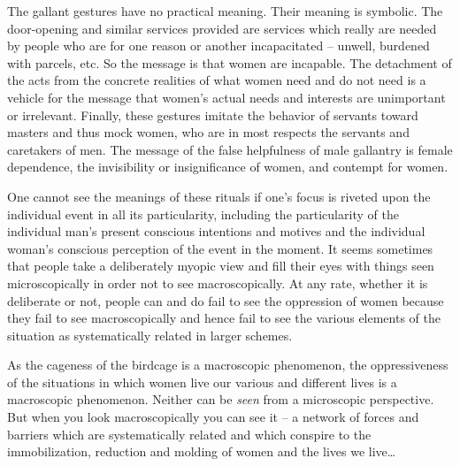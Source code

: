 \documentclass{article}
\begin{document}
The gallant gestures have no practical meaning. Their meaning is symbolic. The
door-opening and similar services provided are services which really are needed
by people who are for one reason or another incapacitated -- unwell, burdened
with parcels, etc. So the message is that women are incapable. The detachment
of the acts from the concrete realities of what women need and do not need is a
vehicle for the message that women's actual needs and interests are unimportant
or irrelevant. Finally, these gestures imitate the behavior of servants toward
masters and thus mock women, who are in most respects the servants and
caretakers of men. The message of the false helpfulness of male gallantry is
female dependence, the invisibility or insignificance of women, and contempt
for women.

One cannot see the meanings of these rituals if one's focus is riveted upon the
individual event in all its particularity, including the particularity of the
individual man's present conscious intentions and motives and the individual
woman's conscious perception of the event in the moment. It seems sometimes
that people take a deliberately myopic view and fill their eyes with things
seen microscopically in order not to see macroscopically. At any rate, whether
it is deliberate or not, people can and do fail to see the oppression of women
because they fail to see macroscopically and hence fail to see the various
elements of the situation as systematically related in larger schemes.

As the cageness of the birdcage is a macroscopic phenomenon, the oppressiveness
of the situations in which women live our various and different lives is a
macroscopic phenomenon. Neither can be \emph{seen} from a microscopic
perspective. But when you look macroscopically you can see it -- a network of
forces and barriers which are systematically related and which conspire to the
immobilization, reduction and molding of women and the lives we live\ldots

\end{document}
